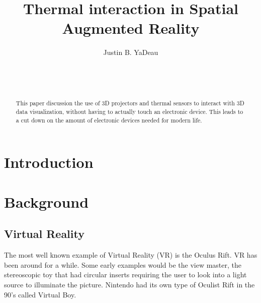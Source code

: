 \documentclass{sig-alternate}
\begin{document}

\title{Thermal interaction in Spatial Augmented Reality}


\author{
\alignauthor
Justin B. YaDeau\\
	\\
	\\
	\\
}

\maketitle

\begin{abstract}
This paper discussion the use of 3D projectors and thermal sensors to interact with 3D data visualization, without having to actually touch an electronic device. This leads to a cut down on the amount of electronic devices needed for modern life.
\end{abstract}


\section{Introduction}
\label{sec:introduction}


\section{Background}
\label{sec:background} 

\subsection{Virtual Reality}
\label{sec:Virtual Reality}

The most well known example of Virtual Reality (VR) is the Oculus Rift. VR has been around for a while. Some early examples would be the view master, the stereoscopic toy that had circular inserts requiring the user to look into a light source to illuminate the picture. Nintendo had its own type of Oculist Rift in the 90's called Virtual Boy.      
\end{document}
